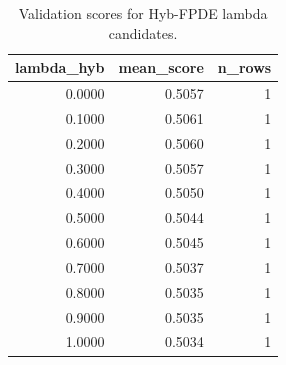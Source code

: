 \begin{table}[t]
\caption{Validation scores for Hyb-FPDE lambda candidates.}
\label{tab:lambda_distribution_computed}
\centering
\begin{tabular}{rrr}
\toprule
lambda\_hyb & mean\_score & n\_rows \\
\midrule
0.0000 & 0.5057 & 1 \\
0.1000 & 0.5061 & 1 \\
0.2000 & 0.5060 & 1 \\
0.3000 & 0.5057 & 1 \\
0.4000 & 0.5050 & 1 \\
0.5000 & 0.5044 & 1 \\
0.6000 & 0.5045 & 1 \\
0.7000 & 0.5037 & 1 \\
0.8000 & 0.5035 & 1 \\
0.9000 & 0.5035 & 1 \\
1.0000 & 0.5034 & 1 \\
\bottomrule
\end{tabular}

\end{table}
